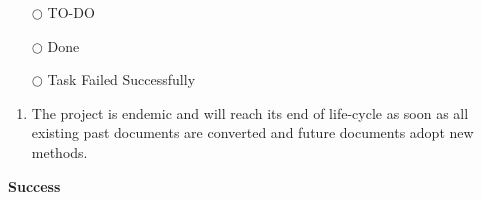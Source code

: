 \documentclass[a4paper,11pt]{texMemo}
\begin{document}
\begin{Note}
\begin{itemize}
\item[{\color{maincol}$\bigcirc$}]
TO-DO
\item[{\color{thirdcol}\rlap{\raisebox{0.2ex}{\hspace{0.6ex}\tiny \ding{52}}}}{\color{maincol}$\bigcirc$}]
Done
\item[{\color{thirdcol}\rlap{\raisebox{0.05ex}{\hspace{0.55ex}\scriptsize \ding{56}}}}{\color{maincol}$\bigcirc$}]
Task Failed Successfully
\end{itemize}
\end{Note}
\decorativeline\bigskip{}
\begin{Abstract}[Questions]
\begin{enumerate}
\item The project is endemic and will reach its end of life-cycle as soon as all existing past documents are converted and future documents adopt new methods.
\end{enumerate}
    \tcblower
        \textbf{Success \faCheckCircle}
\end{Abstract}

\decorativeline\bigskip{}

\lipsum
\end{document}

